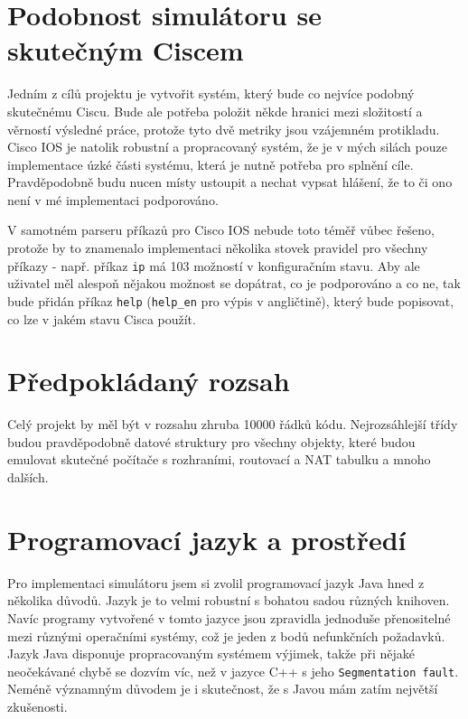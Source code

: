 
\section{Podobnost simulátoru se skutečným Ciscem}\label{kap:podobnost}
Jedním z cílů projektu je vytvořit systém, který bude co nejvíce podobný skutečnému Ciscu. Bude ale potřeba položit někde hranici mezi složitostí a věrností výsledné práce, protože tyto dvě metriky jsou vzájemném protikladu. Cisco IOS je natolik robustní a propracovaný systém, že je v mých silách pouze implementace úzké části systému, která je nutně potřeba pro splnění cíle. Pravděpodobně budu nucen místy ustoupit a nechat vypsat hlášení, že to či ono není v mé implementaci podporováno. 

V samotném parseru příkazů pro Cisco IOS nebude toto téměř vůbec řešeno, protože by to znamenalo implementaci několika stovek pravidel pro všechny příkazy - např. příkaz \verb|ip| má 103 možností v konfiguračním stavu. Aby ale uživatel měl alespoň nějakou možnost se dopátrat, co je podporováno a co ne, tak bude přidán příkaz \verb|help| (\verb|help_en| pro výpis v angličtině), který bude popisovat, co lze v jakém stavu Cisca použít.


\section{Předpokládaný rozsah}
Celý projekt by měl být v rozsahu zhruba 10000 řádků kódu. Nejrozsáhlejší třídy budou pravděpodobně datové struktury pro všechny objekty, které budou emulovat skutečné počítače s rozhraními, routovací a NAT tabulku a mnoho dalších.


\section{Programovací jazyk a prostředí}
Pro implementaci simulátoru jsem si zvolil programovací jazyk Java hned z několika důvodů. Jazyk je to velmi robustní s bohatou sadou různých knihoven. Navíc programy vytvořené v tomto jazyce jsou zpravidla jednoduše přenositelné mezi různými operačními systémy, což je jeden z bodů nefunkčních požadavků. Jazyk Java disponuje propracovaným systémem výjimek, takže při nějaké neočekávané chybě se dozvím víc, než v jazyce C++ s jeho \verb|Segmentation fault|. Neméně významným důvodem je i skutečnost, že s Javou mám zatím největší zkušenosti.

